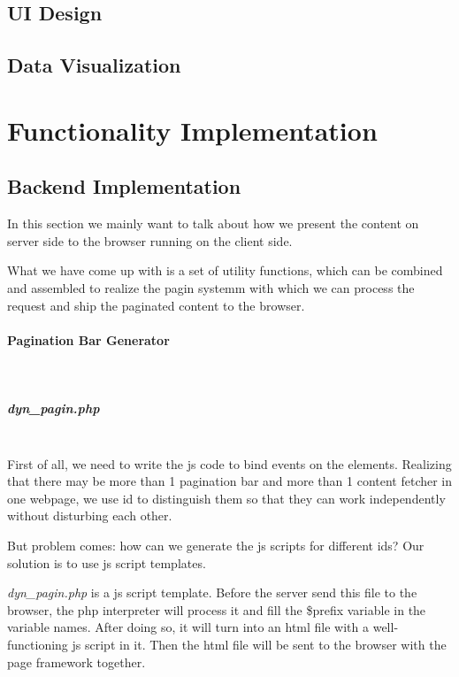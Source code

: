 \documentclass[a4paper, 10pt]{article}
\begin{document}
\subsection{UI Design}
\subsection{Data Visualization}
\section{Functionality Implementation}
\subsection{Backend Implementation}
In this section we mainly want to talk about how we present the content on server side to the browser running on the client side.

What we have come up with is a set of utility functions, which can be combined and assembled to realize the pagin systemm with which we can process the request and ship the paginated content to the browser.
\paragraph{Pagination Bar Generator}\
\subparagraph{dyn\_pagin.php}\ \\
First of all, we need to write the js code to bind events on the elements. Realizing that there may be more than 1 pagination bar and more than 1 content fetcher in one webpage, we use id to distinguish them so that they can work independently without disturbing each other.

But problem comes: how can we generate the js scripts for different ids? Our solution is to use js script templates.

\textit{dyn\_pagin.php} is a js script template. Before the server send this file to the browser, the php interpreter will process it and fill the \$prefix variable in the variable names. After doing so, it will turn into an html file with a well-functioning js script in it. Then the html file will be sent to the browser with the page framework together.
\end{document}
